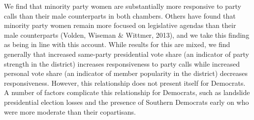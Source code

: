 \documentclass[12pt]{article}
\begin{document}
We find that minority party women are substantially more responsive to party calls than their male counterparts in both chambers. Others have found that minority party women remain more focused on legislative agendas than their male counterparts (Volden, Wiseman \& Wittmer, 2013), and we take this finding as being in line with this account. While results for this are mixed, we find generally that increased same-party presidential vote share (an indicator of party strength in the district) increases responsiveness to party calls while increased personal vote share (an indicator of member popularity in the district) decreases responsiveness. However, this relationship does not present itself for Democrats. A number of factors complicate this relationship for Democrats, such as landslide presidential election losses and the presence of Southern Democrats early on who were more moderate than their copartisans.
\end{document}
